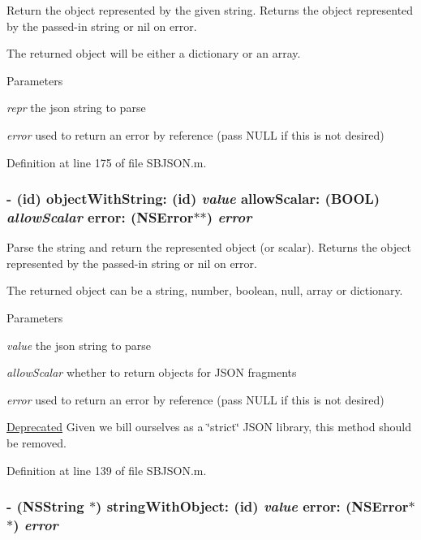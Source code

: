 Return the object represented by the given string. Returns the object represented by the passed-\/in string or nil on error.

The returned object will be either a dictionary or an array.


\begin{DoxyParams}{Parameters}
\item[{\em repr}]the json string to parse \item[{\em error}]used to return an error by reference (pass NULL if this is not desired) \end{DoxyParams}


Definition at line 175 of file SBJSON.m.\hypertarget{interface_s_b_j_s_o_n_a942831fa293980ad189b72860055d32a}{
\subsubsection[{objectWithString:allowScalar:error:}]{\setlength{\rightskip}{0pt plus 5cm}-\/ (id) objectWithString: (id) {\em value}\/ allowScalar: (BOOL) {\em allowScalar}\/ error: (NSError$\ast$$\ast$) {\em error}}}
\label{interface_s_b_j_s_o_n_a942831fa293980ad189b72860055d32a}


Parse the string and return the represented object (or scalar). Returns the object represented by the passed-\/in string or nil on error.

The returned object can be a string, number, boolean, null, array or dictionary.


\begin{DoxyParams}{Parameters}
\item[{\em value}]the json string to parse \item[{\em allowScalar}]whether to return objects for JSON fragments \item[{\em error}]used to return an error by reference (pass NULL if this is not desired)\end{DoxyParams}
\begin{Desc}
\item[\hyperlink{deprecated__deprecated000005}{Deprecated}]Given we bill ourselves as a \char`\"{}strict\char`\"{} JSON library, this method should be removed. \end{Desc}


Definition at line 139 of file SBJSON.m.\hypertarget{interface_s_b_j_s_o_n_a830175bff0fbef8ccb82da852a154b48}{
\subsubsection[{stringWithObject:error:}]{\setlength{\rightskip}{0pt plus 5cm}-\/ ({\bf NSString} $\ast$) stringWithObject: (id) {\em value}\/ error: (NSError$\ast$$\ast$) {\em error}}}
\label{interface_s_b_j_s_o_n_a830175bff0fbef8ccb82da852a154b48}


